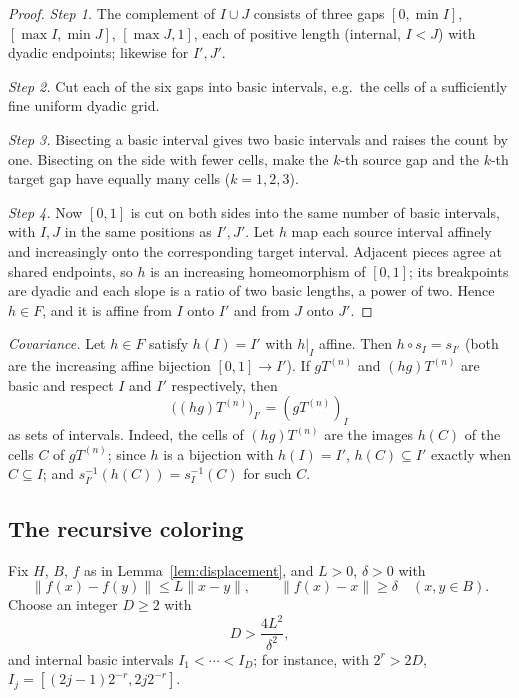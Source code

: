 \documentclass[11pt]{article}
\newcommand{\norm}[1]{\lVert #1\rVert}
\theoremstyle{definition}
\numberwithin{equation}{section}
\begin{document}
\begin{proof}
\emph{Step 1.} The complement of $I\cup J$ consists of three gaps
$[0,\min I]$, $[\max I,\min J]$, $[\max J,1]$, each of positive length
(internal, $I<J$) with dyadic endpoints; likewise for $I',J'$.

\emph{Step 2.} Cut each of the six gaps into basic intervals, e.g.\ the
cells of a sufficiently fine uniform dyadic grid.

\emph{Step 3.} Bisecting a basic interval gives two basic intervals and
raises the count by one. Bisecting on the side with fewer cells, make
the $k$-th source gap and the $k$-th target gap have equally many cells
($k=1,2,3$).

\emph{Step 4.} Now $[0,1]$ is cut on both sides into the same number of
basic intervals, with $I,J$ in the same positions as $I',J'$. Let $h$
map each source interval affinely and increasingly onto the
corresponding target interval. Adjacent pieces agree at shared
endpoints, so $h$ is an increasing homeomorphism of $[0,1]$; its
breakpoints are dyadic and each slope is a ratio of two basic lengths,
a power of two. Hence $h\in F$, and it is affine from $I$ onto $I'$ and
from $J$ onto $J'$.
\end{proof}

\emph{Covariance.} Let $h\in F$ satisfy $h(I)=I'$ with $h|_I$ affine.
Then $h\circ s_I=s_{I'}$ (both are the increasing affine bijection
$[0,1]\to I'$). If $gT^{(n)}$ and $(hg)T^{(n)}$ are basic and respect
$I$ and $I'$ respectively, then
\begin{equation}\label{dyad:covariance}
  \bigl((hg)T^{(n)}\bigr)_{I'}=(gT^{(n)})_I
\end{equation}
as sets of intervals. Indeed, the cells of $(hg)T^{(n)}$ are the images
$h(C)$ of the cells $C$ of $gT^{(n)}$; since $h$ is a bijection with
$h(I)=I'$, $h(C)\subseteq I'$ exactly when $C\subseteq I$; and
$s_{I'}^{-1}(h(C))=s_I^{-1}(C)$ for such $C$.

\subsection{The recursive coloring}\label{sec:coloring}

Fix $H$, $B$, $f$ as in Lemma~\ref{lem:displacement}, and $L>0$,
$\delta>0$ with
\begin{equation}\label{color:map}
  \norm{f(x)-f(y)}\leq L\norm{x-y},\qquad
  \norm{f(x)-x}\geq\delta\quad(x,y\in B).
\end{equation}
Choose an integer $D\ge2$ with
\begin{equation}\label{color:parameters}
  D>\frac{4L^2}{\delta^2},
\end{equation}
and internal basic intervals $I_1<\cdots<I_D$; for instance, with
$2^r>2D$, $I_j=[(2j-1)2^{-r},2j2^{-r}]$.
\end{document}
